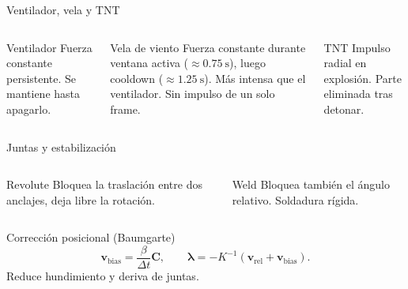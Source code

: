 \documentclass[aspectratio=169,11pt]{beamer}
\begin{document}
\begin{frame}{Ventilador, vela y TNT}
  \begin{columns}[T]
    \begin{block}{Ventilador}
      Fuerza constante persistente. Se mantiene hasta apagarlo.
    \end{block}
    \begin{block}{Vela de viento}
      Fuerza constante durante ventana activa ($\approx 0.75\ \mathrm{s}$),
      luego cooldown ($\approx 1.25\ \mathrm{s}$). Más intensa que el
      ventilador. Sin impulso de un solo frame.
    \end{block}
    \begin{block}{TNT}
      Impulso radial en explosión. Parte eliminada tras detonar.
    \end{block}
  \end{columns}

  \vspace{0.1cm}
  \begin{center}
  \end{center}
\end{frame}

\begin{frame}{Juntas y estabilización}
  \begin{columns}[T]
    \begin{block}{Revolute}
      Bloquea la traslación entre dos anclajes, deja libre la rotación.
    \end{block}
    \begin{block}{Weld}
      Bloquea también el ángulo relativo. Soldadura rígida.
    \end{block}
  \end{columns}

  \vspace{0.1cm}
  \begin{block}{Corrección posicional (Baumgarte)}
    \[
      \mathbf{v}_{\mathrm{bias}}=\frac{\beta}{\Delta t}\mathbf{C},
      \qquad
      \boldsymbol{\lambda}=-K^{-1}(\mathbf{v}_{\mathrm{rel}}+
      \mathbf{v}_{\mathrm{bias}}).
    \]
    Reduce hundimiento y deriva de juntas.
  \end{block}
\end{frame}
\end{document}
